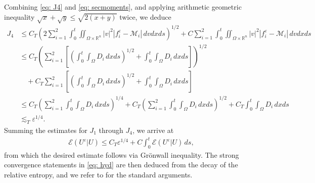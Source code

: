 \documentclass[10pt,reqno]{amsart}
\numberwithin{equation}{section}
\newcommand{\R}{\mathbb R}
\newcommand{\calM}{\mathcal M}
\newcommand{\calE}{\mathcal E}
\newcommand{\ve}{\varepsilon}
\begin{document}
    Combining \eqref{eq: J4} and \eqref{eq: secmoments}, and applying arithmetic geometric inequality $\sqrt{x}+\sqrt{y} \le \sqrt{2(x+y)}$ twice, we deduce
    \begin{align*}
        J_4 &\le C_T \left( 2 \sum_{i=1}^2 \int_0^t \iint_{\Omega \times \R^n} |v|^2 |f_i^\ve - \calM_i|\,dvdxds \right)^{1/2}   + C\sum_{i=1}^2 \int_0^t \iint_{\Omega \times \R^n} |v|^2 |f_i^\ve - \calM_i|\,dvdxds \\
        &\le C_T \left( \sum_{i=1}^2 \left[\left(\int_0^t \int_\Omega D_i\,dxds \right)^{1/2} + \int_0^t \int_\Omega D_i\,dxds \right] \right)^{1/2}  \\
        &\quad + C_T \sum_{i=1}^2 \left[\left(\int_0^t \int_\Omega D_i\,dxds\right)^{1/2} + \int_0^t \int_\Omega D_i\,dxds \right] \\
        &\le C_T \left(\sum_{i=1}^2 \int_0^t \int_\Omega D_i\,dxds \right)^{1/4} + C_T \left(\sum_{i=1}^2 \int_0^t \int_\Omega D_i\,dxds\right)^{1/2} + C_T \int_0^t \int_\Omega D_i\,dxds \\
        &\lesssim_T \ve^{1/4}.
    \end{align*}
 Summing the estimates for $J_1$ through $J_4$, we arrive at
    \begin{align*}
        \calE(U^\ve|U) \le C_T \ve^{1/4} + C\int_0^t \calE(U^\ve|U) \, ds,
    \end{align*}
  from which the desired estimate follows via Gr\"onwall inequality. The strong convergence statements in \eqref{eq: hyd} are then deduced from the decay of the relative entropy, and we refer to \cite{BV05, CCJ21} for the standard arguments.


 






%
%
%
%
%
%
%
%
%
%
%
%
%

 


 
%
%
%                         
%
%
\end{document}

